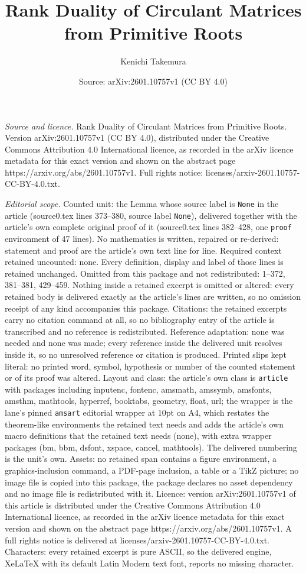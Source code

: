 \documentclass[10pt,a4paper]{amsart}
\title[Rank Duality of Circulant Matrices from Primitive Roots]{Rank Duality of Circulant Matrices from Primitive Roots}
\author{Kenichi Takemura}
\date{Source: arXiv:2601.10757v1 (CC BY 4.0)}
\begin{document}
\maketitle

\noindent\emph{Source and licence.} Rank Duality of Circulant Matrices from Primitive Roots. Version arXiv:2601.10757v1 (CC BY 4.0), distributed under the Creative Commons Attribution 4.0 International licence, as recorded in the arXiv licence metadata for this exact version and shown on the abstract page https://arxiv.org/abs/2601.10757v1. Full rights notice: licenses/arxiv-2601.10757-CC-BY-4.0.txt.\par\smallskip

\noindent\textit{Editorial scope.} Counted unit: the Lemma whose source label is \texttt{None} in the article (source0.tex lines 373--380, source label \texttt{None}), delivered together with the article's own complete original proof of it (source0.tex lines 382--428, one \texttt{proof} environment of 47 lines). No mathematics is written, repaired or re-derived: statement and proof are the article's own text line for line. Required context retained uncounted: none. Every definition, display and label of those lines is retained unchanged. Omitted from this package and not redistributed: 1--372, 381--381, 429--459. Nothing inside a retained excerpt is omitted or altered: every retained body is delivered exactly as the article's lines are written, so no omission receipt of any kind accompanies this package. Citations: the retained excerpts carry no citation command at all, so no bibliography entry of the article is transcribed and no reference is redistributed. Reference adaptation: none was needed and none was made; every reference inside the delivered unit resolves inside it, so no unresolved reference or citation is produced. Printed slips kept literal: no printed word, symbol, hypothesis or number of the counted statement or of its proof was altered. Layout and class: the article's own class is \texttt{article} with packages including inputenc, fontenc, amsmath, amssymb, amsfonts, amsthm, mathtools, hyperref, booktabs, geometry, float, url; the wrapper is the lane's pinned \texttt{amsart} editorial wrapper at 10pt on A4, which restates the theorem-like environments the retained text needs and adds the article's own macro definitions that the retained text needs (none), with extra wrapper packages (bm, bbm, dsfont, xspace, cancel, mathtools). The delivered numbering is the unit's own. Assets: no retained span contains a figure environment, a graphics-inclusion command, a PDF-page inclusion, a table or a TikZ picture; no image file is copied into this package, the package declares no asset dependency and no image file is redistributed with it. Licence: version arXiv:2601.10757v1 of this article is distributed under the Creative Commons Attribution 4.0 International licence, as recorded in the arXiv licence metadata for this exact version and shown on the abstract page https://arxiv.org/abs/2601.10757v1. A full rights notice is delivered at licenses/arxiv-2601.10757-CC-BY-4.0.txt. Characters: every retained excerpt is pure ASCII, so the delivered engine, XeLaTeX with its default Latin Modern text font, reports no missing character.
\end{document}

